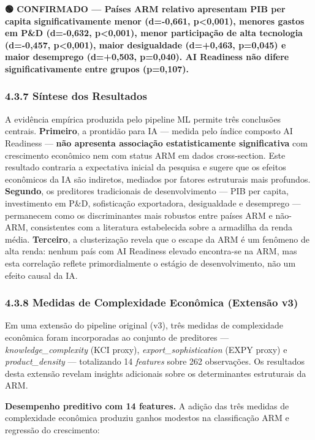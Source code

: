 \documentclass[
  brazilian,
  12pt,
]{article}
\begin{document}
\textbf{🟢 CONFIRMADO --- Países ARM relativo apresentam PIB per capita significativamente menor (d=-0,661, p\textless0,001), menores gastos em P\&D (d=-0,632, p\textless0,001), menor participação de alta tecnologia (d=-0,457, p\textless0,001), maior desigualdade (d=+0,463, p=0,045) e maior desemprego (d=+0,503, p=0,040). AI Readiness não difere significativamente entre grupos (p=0,107).}

\subsubsection{4.3.7 Síntese dos Resultados}\label{suxedntese-dos-resultados}

A evidência empírica produzida pelo pipeline ML permite três conclusões centrais. \textbf{Primeiro}, a prontidão para IA --- medida pelo índice composto AI Readiness --- \textbf{não apresenta associação estatisticamente significativa} com crescimento econômico nem com status ARM em dados cross-section. Este resultado contraria a expectativa inicial da pesquisa e sugere que os efeitos econômicos da IA são indiretos, mediados por fatores estruturais mais profundos. \textbf{Segundo}, os preditores tradicionais de desenvolvimento --- PIB per capita, investimento em P\&D, sofisticação exportadora, desigualdade e desemprego --- permanecem como os discriminantes mais robustos entre países ARM e não-ARM, consistentes com a literatura estabelecida sobre a armadilha da renda média. \textbf{Terceiro}, a clusterização revela que o escape da ARM é um fenômeno de alta renda: nenhum país com AI Readiness elevado encontra-se na ARM, mas esta correlação reflete primordialmente o estágio de desenvolvimento, não um efeito causal da IA.

\subsubsection{4.3.8 Medidas de Complexidade Econômica (Extensão v3)}\label{medidas-de-complexidade-econuxf4mica-extensuxe3o-v3}

Em uma extensão do pipeline original (v3), três medidas de complexidade econômica foram incorporadas ao conjunto de preditores --- \emph{knowledge\_complexity} (KCI proxy), \emph{export\_sophistication} (EXPY proxy) e \emph{product\_density} --- totalizando 14 \emph{features} sobre 262 observações. Os resultados desta extensão revelam insights adicionais sobre os determinantes estruturais da ARM.

\textbf{Desempenho preditivo com 14 features.} A adição das três medidas de complexidade econômica produziu ganhos modestos na classificação ARM e regressão do crescimento:
\end{document}
